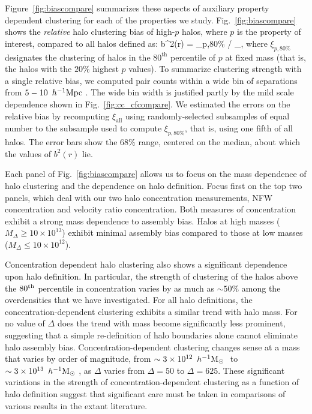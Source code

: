 \documentclass[usenatbib,fleqn]{mnras}
\begin{document}
Figure~\ref{fig:biascompare} summarizes these aspects of auxiliary property dependent clustering for each of the properties we study. Fig.~\ref{fig:biascompare} shows the {\em relative} halo clustering bias of high-$p$ halos, where $p$ is the property of interest, compared to all halos defined as: 
\beq
b^2(r) = \xi_{p,80\%} / \xi_{},
\eeq
%
where $\xi_{p,80\%}$ designates the clustering of halos in the $80^{\mathrm{th}}$ percentile of $p$ at fixed mass (that is, the halos with the $20\%$ highest $p$ values). To summarize clustering strength with a single relative bias, we computed pair counts within a wide bin of separations from $5-10\, \ h^{-1}\mathrm{Mpc}~$. The wide bin width is justified partly by the mild scale dependence shown in Fig.~\ref{fig:cc_cfcompare}. We estimated the errors on the relative bias by recomputing $\xi_{\mathrm{all}}$ using randomly-selected subsamples of equal number to the subsample used to compute $\xi_{p,80\%}$, that is, using one fifth of all halos. The error bars show the $68\%$ range, centered on the median, 
about which the values of $b^2(r)$ lie. 

Each panel of Fig.~\ref{fig:biascompare} allows us to focus on the mass dependence of halo clustering and the dependence on halo definition. Focus first on the top two panels, which deal with our two halo concentration measurements, NFW concentration and velocity ratio concentration. Both measures of concentration exhibit a strong mass dependence to assembly bias. Halos at high masses ($M_{\Delta} \ge 10\times10^{13}$) exhibit minimal assembly bias compared to those at low masses ($M_{\Delta} \le 10\times10^{12}$). 

Concentration dependent halo clustering also shows a significant dependence upon halo definition. In particular, the strength of clustering of the halos above the $80^{\rm{th}}$ percentile in concentration varies by as much as $\sim 50\%$ among the overdensities that we have investigated. For all halo definitions, 
the concentration-dependent clustering exhibits a similar trend with halo mass. For no value of $\Delta$ does the trend with mass become significantly less prominent, suggesting that a simple re-definition of halo boundaries alone cannot eliminate halo assembly bias. Concentration-dependent clustering changes sense at a mass that varies by order of magnitude, from $\sim 3 \times 10^{12}\, \ h^{-1}\mathrm{M}_{\odot}~$ to $\sim 3 \times 10^{13}\, \ h^{-1}\mathrm{M}_{\odot}~$, as $\Delta$ varies from $\Delta=50$ to $\Delta=625$. These significant variations in the strength of concentration-dependent clustering as a function of halo definition suggest that significant care must be taken in comparisons of various results in the extant literature.
\end{document}
